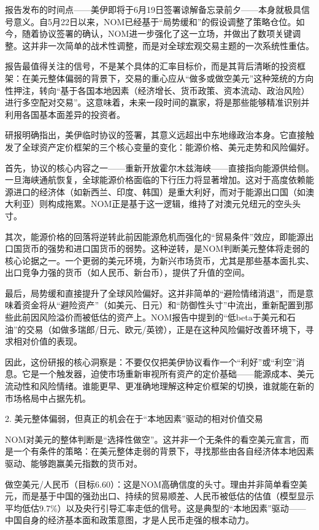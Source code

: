 \documentclass[11pt]{ctexart}
\begin{document}
报告发布的时间点——美伊即将于6月19日签署谅解备忘录前夕——本身就极具信号意义。自5月22日以来，NOM已经基于“局势缓和”的假设调整了策略仓位。如今，随着协议签署的确认，NOM进一步强化了这一立场，并做出了数项关键调整。这并非一次简单的战术性调整，而是对全球宏观交易主题的一次系统性重估。

报告最值得关注的信号，不是某个具体的汇率目标价，而是其背后清晰的投资框架：在美元整体偏弱的背景下，交易的重心应从“做多或做空美元”这种笼统的方向性押注，转向“基于各国本地因素（经济增长、货币政策、资本流动、政治风险）进行多空配对交易”。这意味着，未来一段时间的赢家，将是那些能够精准识别并利用各国基本面差异的投资者。

研报明确指出，美伊临时协议的签署，其意义远超出中东地缘政治本身。它直接触发了全球资产定价框架的三个核心变量的变化：能源价格、美元走势和风险偏好。

首先，协议的核心内容之一——重新开放霍尔木兹海峡——直接指向能源供给侧。一旦海峡通航恢复，全球能源价格面临的下行压力将显著增加。这对于高度依赖能源进口的经济体（如新西兰、印度、韩国）是重大利好，而对于能源出口国（如澳大利亚）则构成拖累。NOM正是基于这一逻辑，维持了对澳元兑纽元的空头头寸。

其次，能源价格的回落将逆转此前因能源危机而强化的“贸易条件”效应，即能源出口国货币的强势和进口国货币的弱势。这种逆转，是NOM判断美元整体将走弱的核心论据之一。一个更弱的美元环境，为新兴市场货币，尤其是那些基本面扎实、出口竞争力强的货币（如人民币、新台币），提供了升值的空间。

最后，局势缓和直接提升了全球风险偏好。这并非简单的“避险情绪消退”，而是意味着资金将从“避险资产”（如美元、日元）和“防御性头寸”中流出，重新配置到那些此前因风险溢价而被低估的资产上。NOM报告中提到的“低beta于美元和石油”的交易（如做多瑞郎/日元、欧元/英镑），正是在这种风险偏好改善环境下，寻求相对价值的表现。

因此，这份研报的核心洞察是：不要仅仅把美伊协议看作一个“利好”或“利空”消息。它是一个触发器，迫使市场重新审视所有资产的定价基础——能源成本、美元流动性和风险情绪。谁能更早、更准确地理解这种定价框架的切换，谁就能在新的市场格局中占据先机。

2. 美元整体偏弱，但真正的机会在于“本地因素”驱动的相对价值交易

NOM对美元的整体判断是“选择性做空”。这并非一个无条件的看空美元宣言，而是一个有条件的策略：在美元整体走弱的背景下，寻找那些由各自经济体本地因素驱动、能够跑赢美元指数的货币对。

做空美元/人民币（目标6.60）：这是NOM高确信度的头寸。理由并非简单看空美元，而是基于中国的强劲出口、持续的贸易顺差、人民币被低估的估值（模型显示平均低估9.7\%）以及央行引导汇率走低的信号。这是典型的“本地因素”驱动——中国自身的经济基本面和政策意图，才是人民币走强的根本动力。
\end{document}
